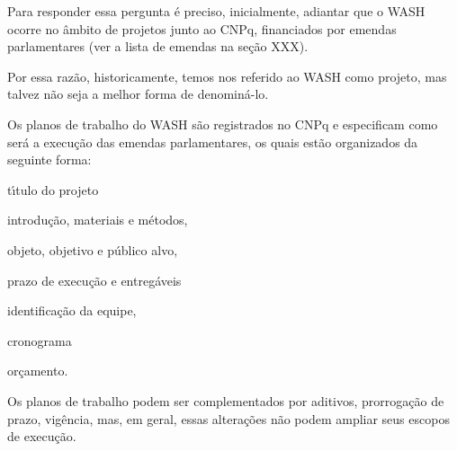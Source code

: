 \documentclass[
12pt,		%
openright,	%
twoside,  %
a4paper,			%
chapter=TITLE,		%
english,			%
french,				%
spanish,			%
brazil				%
]{USPSC-classe/USPSC}
\begin{document}
Para responder essa pergunta \'e preciso, inicialmente, adiantar que o WASH ocorre no \^ambito de projetos junto ao CNPq, financiados por emendas parlamentares (ver a lista de emendas na se\c{c}\~ao XXX).

















Por essa raz\~ao, historicamente, temos nos referido ao WASH como projeto, mas talvez n\~ao seja a melhor forma de denomin\'a-lo.

















Os planos de trabalho do WASH s\~ao registrados no CNPq e especificam como ser\'a a execu\c{c}\~ao das emendas parlamentares, os quais est\~ao organizados da seguinte forma:


















\begin{alineas}
\item t\'{\i}tulo do projeto
\item introdu\c{c}\~ao, materiais e m\'etodos,
\item objeto, objetivo e p\'ublico alvo,
\item prazo de execu\c{c}\~ao e entreg\'aveis
\item identifica\c{c}\~ao da equipe,
\item cronograma
\item or\c{c}amento.
\end{alineas}

Os planos de trabalho podem ser complementados por aditivos, prorroga\c{c}\~ao de prazo, vig\^encia, mas, em geral, essas altera\c{c}\~oes n\~ao podem ampliar seus escopos de execu\c{c}\~ao.
\end{document}
